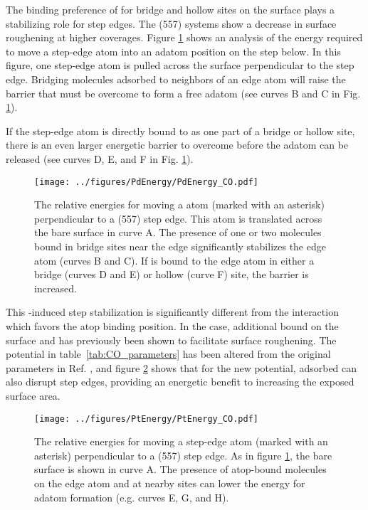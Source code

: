 \documentclass[journal = jpccck, manuscript = article]{achemso}
\begin{document}
The binding preference of  for bridge and hollow sites on the
 surface plays a stabilizing role for step edges.  The
(557) systems show a decrease in surface roughening at higher
 coverages. Figure \ref{fig:PdEnergy} shows an analysis of the
energy required to move a step-edge atom into an adatom position on
the step below. In this figure, one step-edge  atom is pulled
across the surface perpendicular to the step edge.  Bridging 
molecules adsorbed to neighbors of an edge atom will raise the barrier
that must be overcome to form a free adatom (see curves B and C in
Fig. \ref{fig:PdEnergy}).

If the step-edge atom is directly bound to  as one part of a
bridge or hollow site, there is an even larger energetic barrier to
overcome before the adatom can be released (see curves D, E, and F in
Fig. \ref{fig:PdEnergy}).

\begin{figure}
  \texttt{[image: ../figures/PdEnergy/PdEnergy\_CO.pdf]}
  \caption{The relative energies for moving a  atom (marked
    with an asterisk) perpendicular to a (557) step edge. This atom is
    translated across the bare  surface in curve A. The
    presence of one or two  molecules bound in bridge sites
    near the edge significantly stabilizes the edge atom (curves B and
    C).  If  is bound to the edge atom in either a bridge
    (curves D and E) or hollow (curve F) site, the barrier is
    increased.} \label{fig:PdEnergy}
\end{figure}

This -induced step stabilization is significantly different
from the  interaction which favors the atop binding
position. In the  case, additional bound  on
the surface and has previously been shown to facilitate surface
roughening.\cite{Michalka:2013} The  potential in
table~\ref{tab:CO_parameters} has been altered from the original
parameters in Ref. , and figure
\ref{fig:PtEnergy} shows that for the new potential, adsorbed 
can also disrupt step edges, providing an energetic benefit to
increasing the exposed  surface area.

\begin{figure}
  \texttt{[image: ../figures/PtEnergy/PtEnergy\_CO.pdf]}
  \caption{The relative energies for moving a step-edge  atom
    (marked with an asterisk) perpendicular to a (557) step edge.  As in
    figure \ref{fig:PdEnergy}, the bare surface is shown in curve A.
    The presence of atop-bound  molecules on the edge atom and
    at nearby sites can lower the energy for adatom formation
    (e.g. curves E, G, and H).} \label{fig:PtEnergy}
\end{figure}
\end{document}
